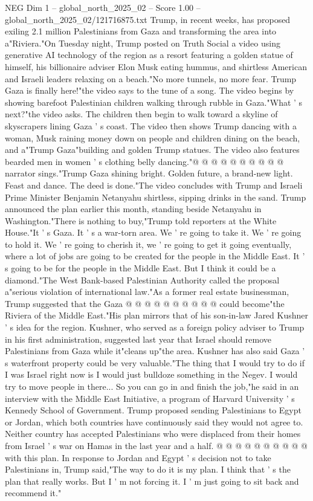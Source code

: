 \begin{textsample}{NEG Dim 1 – global\_north\_2025\_02 – Score 1.00 – global\_north\_2025\_02/121716875.txt}  \label{ex:f1_neg_013}
Trump, in recent weeks, has proposed exiling 2.1 million Palestinians from Gaza and transforming the area into a"Riviera."On Tuesday night, Trump posted on Truth Social a video using generative AI technology of the region as a resort featuring a golden statue of himself, his billionaire adviser Elon Musk eating hummus, and shirtless American and Israeli leaders relaxing on a beach."No more tunnels, no more fear.
Trump Gaza is finally here!"the video says to the tune of a song.
The video begins by showing barefoot Palestinian children walking through rubble in Gaza."What ' s next?"the video asks.
The children then begin to walk toward a skyline of skyscrapers lining Gaza ' s coast.
The video then shows Trump dancing with a woman, Musk raining money down on people and children dining on the beach, and a"Trump Gaza"building and golden Trump statues.
The video also features bearded men in women ' s clothing belly dancing."@ @ @ @ @ @ @ @ @ @ narrator sings."Trump Gaza shining bright.
Golden future, a brand-new light.
Feast and dance.
The deed is done."The video concludes with Trump and Israeli Prime Minister Benjamin Netanyahu shirtless, sipping drinks in the sand.
Trump announced the plan earlier this month, standing beside Netanyahu in Washington."There is nothing to buy,"Trump told reporters at the White House."It ' s Gaza.
It ' s a war-torn area.
We ' re going to take it.
We ' re going to hold it.
We ' re going to cherish it, we ' re going to get it going eventually, where a lot of jobs are going to be created for the people in the Middle East.
It ' s going to be for the people in the Middle East.
But I think it could be a diamond."The West Bank-based Palestinian Authority called the proposal a"serious violation of international law."As a former real estate businessman, Trump suggested that the Gaza @ @ @ @ @ @ @ @ @ @ could become"the Riviera of the Middle East."His plan mirrors that of his son-in-law Jared Kushner ' s idea for the region.
Kushner, who served as a foreign policy adviser to Trump in his first administration, suggested last year that Israel should remove Palestinians from Gaza while it"cleans up"the area.
Kushner has also said Gaza ' s waterfront property could be very valuable."The thing that I would try to do if I was Israel right now is I would just bulldoze something in the Negev.
I would try to move people in there...
So you can go in and finish the job,"he said in an interview with the Middle East Initiative, a program of Harvard University ' s Kennedy School of Government.
Trump proposed sending Palestinians to Egypt or Jordan, which both countries have continuously said they would not agree to.
Neither country has accepted Palestinians who were displaced from their homes from Israel ' s war on Hamas in the last year and a half. @ @ @ @ @ @ @ @ @ @ with this plan.
In response to Jordan and Egypt ' s decision not to take Palestinians in, Trump said,"The way to do it is my plan.
I think that ' s the plan that really works.
But I ' m not forcing it.
I ' m just going to sit back and recommend it."

\end{textsample}
